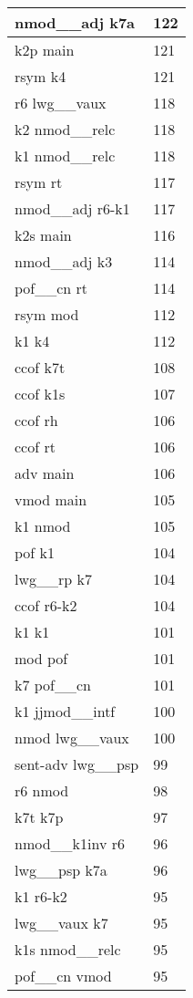 \documentclass[a4 paper]{article}
\begin{document}
\begin{longtable}{p{}p{}}
nmod\_\_adj k7a  & 122 \\ \midrule
k2p main  & 121 \\ \midrule
rsym k4  & 121 \\ \midrule
r6 lwg\_\_vaux  & 118 \\ \midrule
k2 nmod\_\_relc  & 118 \\ \midrule
k1 nmod\_\_relc  & 118 \\ \midrule
rsym rt  & 117 \\ \midrule
nmod\_\_adj r6-k1  & 117 \\ \midrule
k2s main  & 116 \\ \midrule
nmod\_\_adj k3  & 114 \\ \midrule
pof\_\_cn rt  & 114 \\ \midrule
rsym mod  & 112 \\ \midrule
k1 k4  & 112 \\ \midrule
ccof k7t  & 108 \\ \midrule
ccof k1s  & 107 \\ \midrule
ccof rh  & 106 \\ \midrule
ccof rt  & 106 \\ \midrule
adv main  & 106 \\ \midrule
vmod main  & 105 \\ \midrule
k1 nmod  & 105 \\ \midrule
pof k1  & 104 \\ \midrule
lwg\_\_rp k7  & 104 \\ \midrule
ccof r6-k2  & 104 \\ \midrule
k1 k1  & 101 \\ \midrule
mod pof  & 101 \\ \midrule
k7 pof\_\_cn  & 101 \\ \midrule
k1 jjmod\_\_intf  & 100 \\ \midrule
nmod lwg\_\_vaux  & 100 \\ \midrule
sent-adv lwg\_\_psp  & 99 \\ \midrule
r6 nmod  & 98 \\ \midrule
k7t k7p  & 97 \\ \midrule
nmod\_\_k1inv r6  & 96 \\ \midrule
lwg\_\_psp k7a  & 96 \\ \midrule
k1 r6-k2  & 95 \\ \midrule
lwg\_\_vaux k7  & 95 \\ \midrule
k1s nmod\_\_relc  & 95 \\ \midrule
pof\_\_cn vmod  & 95 \\ \midrule

\end{longtable}
\end{document}
